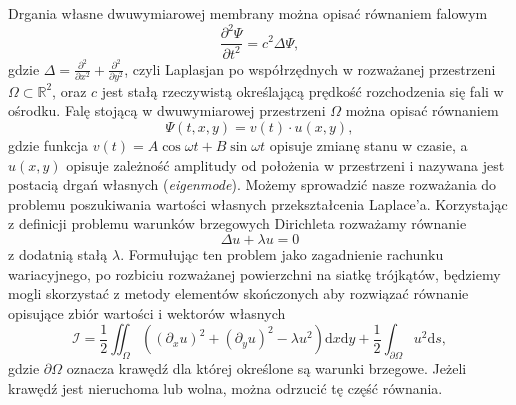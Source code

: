 \documentclass{classrep}
\begin{document}
Drgania własne dwuwymiarowej membrany można opisać równaniem falowym
\begin{equation}
\frac{\partial^2 \Psi}{\partial t^2} = c^2 \Delta \Psi,
\end{equation}
gdzie $\Delta = \frac{\partial^2}{\partial x^2} + \frac{\partial^2}{\partial y^2}$, czyli Laplasjan po współrzędnych w rozważanej przestrzeni $\Omega \subset \mathbb{R}^2$, oraz $c$ jest stałą rzeczywistą określającą prędkość rozchodzenia się fali w ośrodku.
Falę stojącą w dwuwymiarowej przestrzeni $\Omega$ można opisać równaniem
\begin{equation}
\Psi(t, x, y) = v(t) \cdot u(x, y),
\end{equation}
gdzie funkcja $v(t) = A\cos{\omega t} + B\sin{\omega t}$ opisuje zmianę stanu w czasie, a $u(x, y)$ opisuje zależność amplitudy od położenia w przestrzeni i nazywana jest postacią drgań własnych (\textit{eigenmode}).
Możemy sprowadzić nasze rozważania do problemu poszukiwania wartości własnych przekształcenia Laplace'a. Korzystając z definicji problemu warunków brzegowych Dirichleta rozważamy równanie 
\begin{equation}
\Delta u +\lambda u=0
\end{equation}
z dodatnią stałą $\lambda$. %
Formułując ten problem jako zagadnienie rachunku wariacyjnego, po rozbiciu rozważanej powierzchni na siatkę trójkątów, będziemy mogli skorzystać z metody elementów skończonych aby rozwiązać równanie opisujące zbiór wartości i wektorów własnych 
\begin{equation} \label{big_integral}
\mathcal{I} = \frac{1}{2}\iint_\Omega \left(\left(\partial_x u\right)^2+\left(\partial_y u\right)^2-\lambda u^2\right)\mathrm{d}x\mathrm{d}y+\frac{1}{2}\int_{\partial \Omega} u^2\mathrm{d}s,
\end{equation}
gdzie $\partial\Omega$ oznacza krawędź dla której określone są warunki brzegowe. Jeżeli krawędź jest nieruchoma lub wolna, można odrzucić tę część równania.
\end{document}
